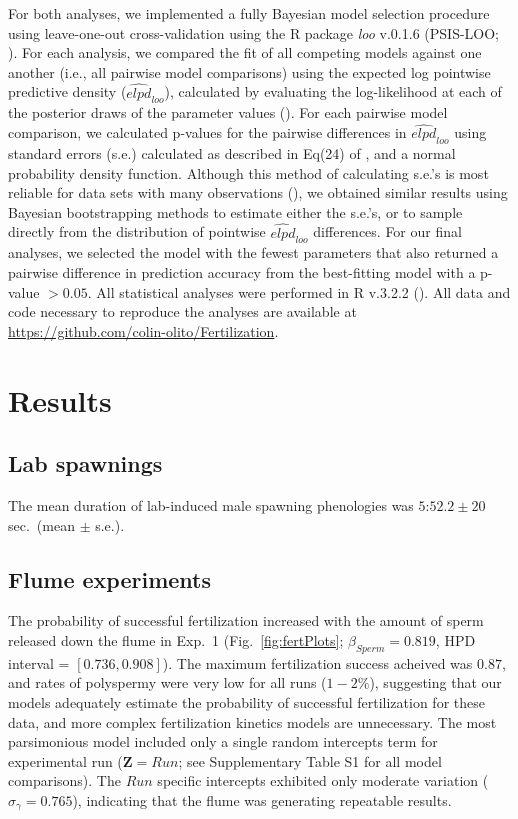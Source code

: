 \documentclass{article}
\begin{document}
	For both analyses, we implemented a fully Bayesian model selection procedure using leave-one-out cross-validation using the R package \textit{loo} v.0.1.6 (PSIS-LOO; \citealt{Vehtari2016}). For each analysis, we compared the fit of all competing models against one another (i.e., all pairwise model comparisons) using the expected log pointwise predictive density ($\widehat{\textit{elpd}}_{\textit{loo}}$), calculated by evaluating the log-likelihood at each of the posterior draws of the parameter values (\citealt{HootenHobbs2015,Vehtari2016}). For each pairwise model comparison, we calculated p-values for the pairwise differences in $\widehat{\textit{elpd}}_{\textit{loo}}$ using standard errors (s.e.) calculated as described in Eq(24) of \citet{Vehtari2016}, and a normal probability density function. Although this method of calculating s.e.'s is most reliable for data sets with many observations (\citealt{Vehtari2016}), we obtained similar results using Bayesian bootstrapping methods to estimate either the s.e.'s, or to sample directly from the distribution of pointwise $\widehat{\textit{elpd}}_{\textit{loo}}$ differences. For our final analyses, we selected the model with the fewest parameters that also returned a pairwise difference in prediction accuracy from the best-fitting model with a p-value $> 0.05$. All statistical analyses were performed in R v.3.2.2 (\citealt{R2016}). All data and code necessary to reproduce the analyses are available at \url{https://github.com/colin-olito/Fertilization}.

\section*{Results}

	\subsection*{Lab spawnings}

	The mean duration of lab-induced male spawning phenologies was $5$:$52.2 \pm 20$ sec.~(mean $\pm$ s.e.).
	
	\subsection*{Flume experiments}

	The probability of successful fertilization increased with the amount of sperm released down the flume in Exp.~1 (Fig.~\ref{fig:fertPlots}; $\beta_{Sperm} = 0.819$, HPD interval = $[0.736,0.908]$). The maximum fertilization success acheived was $0.87$, and rates of polyspermy were very low for all runs ($1-2\%$), suggesting that our models adequately estimate the probability of successful fertilization for these data, and more complex fertilization kinetics models are unnecessary. The most parsimonious model included only a single random intercepts term for experimental run ($\mathbf{Z} = Run$; see Supplementary Table S1 for all model comparisons). The $Run$ specific intercepts exhibited only moderate variation ($\sigma_{\gamma} = 0.765$), indicating that the flume was generating repeatable results.
\end{document}
